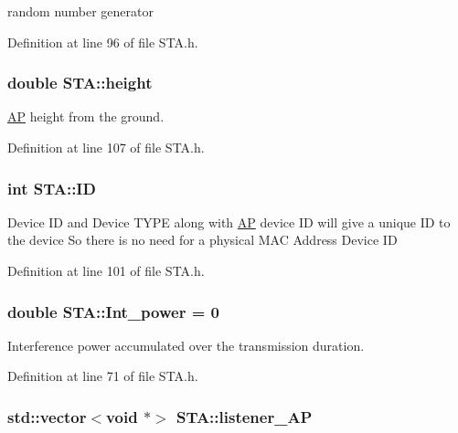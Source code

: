 random number generator 



Definition at line 96 of file S\-T\-A.\-h.

\hypertarget{classSTA_a85ba9b72f68ceeef8c89f02806c71890}{
\subsubsection[{height}]{\setlength{\rightskip}{0pt plus 5cm}double S\-T\-A\-::height}}\label{classSTA_a85ba9b72f68ceeef8c89f02806c71890}


\hyperlink{classAP}{A\-P} height from the ground. 



Definition at line 107 of file S\-T\-A.\-h.

\hypertarget{classSTA_a9376abb50969b5b16aeb5fb0e449e6f7}{
\subsubsection[{I\-D}]{\setlength{\rightskip}{0pt plus 5cm}int S\-T\-A\-::\-I\-D}}\label{classSTA_a9376abb50969b5b16aeb5fb0e449e6f7}
Device I\-D and Device T\-Y\-P\-E along with \hyperlink{classAP}{A\-P} device I\-D will give a unique I\-D to the device So there is no need for a physical M\-A\-C Address Device I\-D 

Definition at line 101 of file S\-T\-A.\-h.

\hypertarget{classSTA_aa1e60f7391861b468314437fbad67280}{
\subsubsection[{Int\-\_\-power}]{\setlength{\rightskip}{0pt plus 5cm}double S\-T\-A\-::\-Int\-\_\-power = 0\hspace{0.3cm}{\ttfamily [private]}}}\label{classSTA_aa1e60f7391861b468314437fbad67280}


Interference power accumulated over the transmission duration. 



Definition at line 71 of file S\-T\-A.\-h.

\hypertarget{classSTA_ad1ed3b95cc0693485be77e8910253ea1}{
\subsubsection[{listener\-\_\-\-A\-P}]{\setlength{\rightskip}{0pt plus 5cm}std\-::vector$<$void $\ast$$>$ S\-T\-A\-::listener\-\_\-\-A\-P}}\label{classSTA_ad1ed3b95cc0693485be77e8910253ea1}


